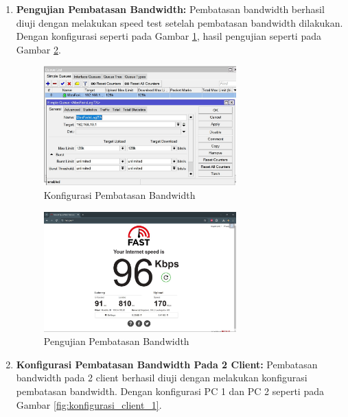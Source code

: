 \begin{enumerate}
    \item \textbf{Pengujian Pembatasan Bandwidth:} Pembatasan bandwidth berhasil diuji dengan melakukan speed test setelah pembatasan bandwidth dilakukan. Dengan konfigurasi seperti pada Gambar \ref{fig:konfigurasi_bandwidth}, hasil pengujian seperti pada Gambar \ref{fig:pengujian_bandwidth}.
    
    \begin{figure}[H]
        \centering
        \includegraphics[width=0.7\textwidth]{img/Set Pertama.jpeg}
        \caption{Konfigurasi Pembatasan Bandwidth}
        \label{fig:konfigurasi_bandwidth}
    \end{figure}

    \begin{figure}[H]
        \centering
        \includegraphics[width=0.7\textwidth]{img/Hasil Set pErtama.jpeg}
        \caption{Pengujian Pembatasan Bandwidth}
        \label{fig:pengujian_bandwidth}
    \end{figure}

    \item \textbf{Konfigurasi Pembatasan Bandwidth Pada 2 Client:} Pembatasan bandwidth pada 2 client berhasil diuji dengan melakukan konfigurasi pembatasan bandwidth. Dengan konfigurasi PC 1 dan PC 2 seperti pada Gambar \ref{fig:konfigurasi_client_1}.
    

\end{enumerate}
